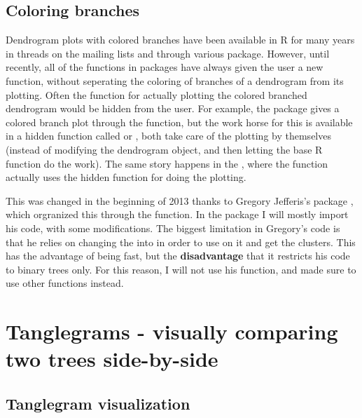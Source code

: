 \documentclass[shortnames,nojss,article]{jss}\usepackage{graphicx, color}
\begin{document}
\subsection{Coloring branches}


Dendrogram plots with colored branches have been available in R for many years in threads on the mailing lists and through various package. However, until recently, all of the functions in packages have always given the user a new  function, without seperating the coloring of branches of a dendrogram from its plotting. Often the function for actually plotting the colored branched dendrogram would be hidden from the user. For example, the  package \citep{CRAN:labeltodendro} gives a colored branch plot through the  function, but the work horse for this is available in a hidden function called  or , both take care of the plotting by themselves (instead of modifying the dendrogram object, and then letting the base R function do the work). The same story happens in the  \citep{CRAN:Heatplus}, where the  function actually uses the hidden function  for doing the plotting.

This was changed in the beginning of 2013 thanks to Gregory Jefferis's  package \citep{CRAN:dendroextras}, which orgranized this through the  function. In the  package I will mostly import his code, with some modifications. The biggest limitation in Gregory's code is that he relies on changing the  into  in order to use  on it and get the clusters. This has the advantage of being fast, but the \textbf{disadvantage} that it restricts his code to binary trees only. For this reason, I will not use his  function, and made sure to use other functions instead.






\section{Tanglegrams - visually comparing two trees side-by-side}

\subsection{Tanglegram visualization}
\end{document}
